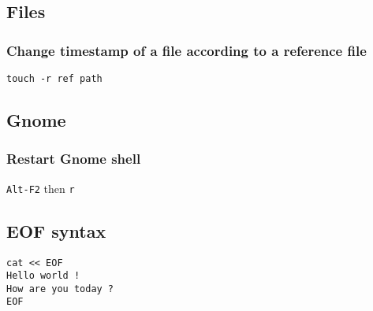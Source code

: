 \subsection{Files}
\subsubsection{Change timestamp of a file according to a reference file}
\verb|touch -r ref path|

\subsection{Gnome}
\subsubsection{Restart Gnome shell}
\verb|Alt-F2| then \verb|r|

\subsection{EOF syntax}
\begin{verbatim}
cat << EOF
Hello world !
How are you today ?
EOF
\end{verbatim}
